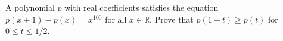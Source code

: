 \documentclass{article}
\begin{document}
\setlength{\parindent}{0pt}
A polynomial \(\displaystyle p\) with real coefficients satisfies the equation \(\displaystyle p(x+1)-p(x)=x^{100}\) for all \(\displaystyle x\in\mathbb{R}\). Prove that \(\displaystyle p(1-t)\geqslant p(t)\) for \(\displaystyle 0\leqslant t\leqslant 1/2\).
\end{document}
